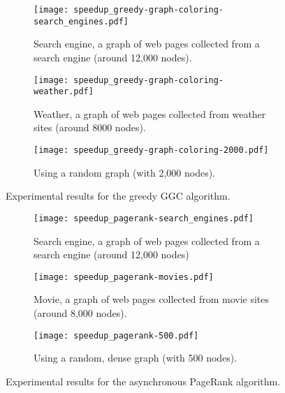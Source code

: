 \newcommand{\figsize}[0]{6.5cm}

\begin{figure*}[htp]
   \centering
   \begin{subfigure}[b]{0.3\textwidth}
      \texttt{[image: speedup\_greedy-graph-coloring-search\_engines.pdf]}
      \caption{Search engine, a graph of web pages collected from a search engine (around 12,000 nodes).}
   \end{subfigure}
   \begin{subfigure}[b]{0.3\textwidth}
      \texttt{[image: speedup\_greedy-graph-coloring-weather.pdf]}
      \caption{Weather, a graph of web pages collected from weather sites (around 8000 nodes).\newline}
   \end{subfigure}
   \begin{subfigure}[b]{0.3\textwidth}
      \texttt{[image: speedup\_greedy-graph-coloring-2000.pdf]}
      \caption{Using a random graph (with 2,000 nodes).\newline\newline}
   \end{subfigure}
   \caption{Experimental results for the greedy GGC algorithm.}
   \label{exp:graph_coloring}
\end{figure*}

\begin{figure*}[htp]
   \centering
   \begin{subfigure}[b]{0.3\textwidth}
      \texttt{[image: speedup\_pagerank-search\_engines.pdf]}
      \caption{Search engine, a graph of web pages collected from a search engine (around 12,000 nodes)}
   \end{subfigure}
   \begin{subfigure}[b]{0.3\textwidth}
      \texttt{[image: speedup\_pagerank-movies.pdf]}
      \caption{Movie, a graph of web pages collected from movie sites (around 8,000 nodes).\newline}
   \end{subfigure}
   \begin{subfigure}[b]{0.3\textwidth}
      \texttt{[image: speedup\_pagerank-500.pdf]}
      \caption{Using a random, dense graph (with 500 nodes).\newline\newline}
   \end{subfigure}
   \caption{Experimental results for the asynchronous PageRank algorithm.}
   \label{exp:pagerank}
\end{figure*}

